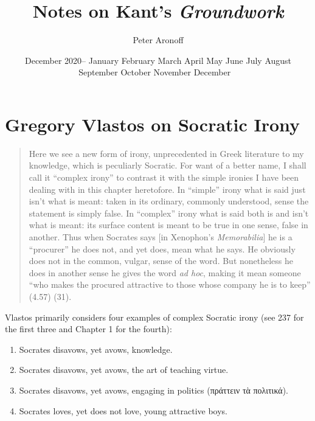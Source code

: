 \documentclass[12pt,letterpaper]{article}
\newcommand{\MONTH}{%
  \ifcase\the\month
  \or January%
  \or February%
  \or March%
  \or April%
  \or May%
  \or June%
  \or July%
  \or August%
  \or September%
  \or October%
  \or November%
  \or December%
  \fi}
\begin{document}
\begin{titlepage}
\title{Notes on Kant's \textit{Groundwork}}
\author{Peter Aronoff}
\date{December 2020--\MONTH\ \the\year}
\maketitle
\thispagestyle{empty}
\end{titlepage}

\pagestyle{notes}

\section*{Gregory Vlastos on Socratic Irony}

\begin{quote}

    Here we see a new form of irony, unprecedented in Greek literature to my knowledge, which is peculiarly Socratic.
For want of a better name, I shall call it ``complex irony'' to contrast it with the simple ironies I have been dealing with in this chapter heretofore.
In ``simple'' irony what is said just isn't what is meant: taken in its ordinary, commonly understood, sense the statement is simply false.
In ``complex'' irony what is said both is and isn't what is meant: its surface content is meant to be true in one sense, false in another.
Thus when Socrates says [in Xenophon's \textit{Memorabilia}] he is a ``procurer'' he does not, and yet does, mean what he says.
He obviously does not in the common, vulgar, sense of the word.
But nonetheless he does in another sense he gives the word \textit{ad hoc}, making it mean someone ``who makes the procured attractive to those whose company he is to keep'' (4.57) (31).

\end{quote}

Vlastos primarily considers four examples of complex Socratic irony (see 237 for the first three and Chapter 1 for the fourth):

\begin{enumerate}
    \item Socrates disavows, yet avows, knowledge.
    \item Socrates disavows, yet avows, the art of teaching virtue.
    \item Socrates disavows, yet avows, engaging in politics (\textgreek{πράττειν τὰ πολιτικά}).
    \item Socrates loves, yet does not love, young attractive boys.
\end{enumerate}
\end{document}
